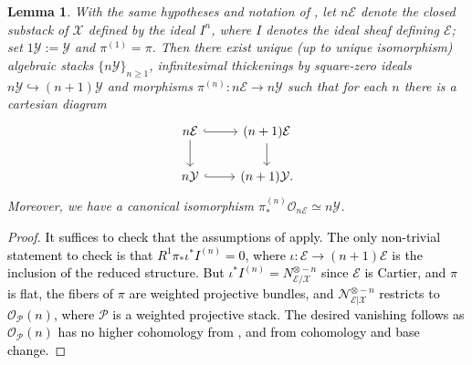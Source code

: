\documentclass{amsart}
\newcommand{\cE}{\mathcal{E}}
\newcommand{\cN}{\mathcal{N}}
\newcommand{\cO}{\mathcal{O}}
\newcommand{\cP}{\mathcal{P}}
\newcommand{\cX}{\mathcal{X}}
\newcommand{\cY}{\mathcal{Y}}
\newtheorem{Lemma}[theorem]{Lemma}
\theoremstyle{definition}
\begin{document}
\begin{Lemma}\label{lemma:step1}
    With the same hypotheses and notation of , let $n\cE$ denote the closed substack of $\cX$ defined by the ideal $I^n$, where $I$ denotes the ideal sheaf defining $\cE$; set $1\cY:=\cY$ and $\pi^{(1)}=\pi$. Then there exist unique (up to unique isomorphism) algebraic stacks $\{n\cY\}_{n\geq 1}$, infinitesimal thickenings by square-zero ideals $n\cY\hookrightarrow(n+1)\cY$ and morphisms $\pi^{(n)}:n\cE\to n\cY$ such that for each $n$ there is a cartesian diagram
    $$ 
    \begin{tikzcd}
    n\cE \arrow[d] \arrow[r, hook] & (n+1)\cE \arrow[d] \\
    n\cY \arrow[r, hook]   & (n+1)\cY.                  
    \end{tikzcd}
    $$
    Moreover, we have a canonical isomorphism $\pi^{(n)}_*\cO_{n\cE} \simeq n\cY$.
\end{Lemma}


\begin{proof}\textcolor{black}{It suffices to check that the assumptions of  apply. The only non-trivial statement to check is that $R^1\pi_*\iota^*I^{(n)}=0$, where $\iota:\cE\to (n+1)\cE$ is the inclusion of the reduced structure.   
    But $\iota^*I^{(n)} =N_{\cE/\cX}^{\otimes -n} $ since $\cE$ is Cartier, and $\pi$ is flat, the fibers of $\pi$ are weighted projective bundles, and $\cN_{\cE\vert\cX}^{\otimes -n}$ restricts to $\cO_\cP(n)$, where $\cP $ is a weighted projective stack. The desired vanishing follows as $\cO_\cP(n)$ has no higher cohomology from \cite[Prop. 2.5]{meier2015vector}, and from cohomology and base change.}
\end{proof}
\end{document}
